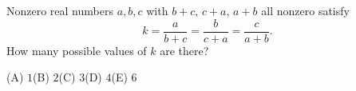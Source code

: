 Nonzero real numbers $a,b,c$ with $b+c$, $c+a$, $a+b$ all nonzero satisfy
\[
k=\dfrac{a}{b+c}=\dfrac{b}{c+a}=\dfrac{c}{a+b}.
\]
How many possible values of $k$ are there?

(A) $1$\quad (B) $2$\quad (C) $3$\quad (D) $4$\quad (E) $6$
